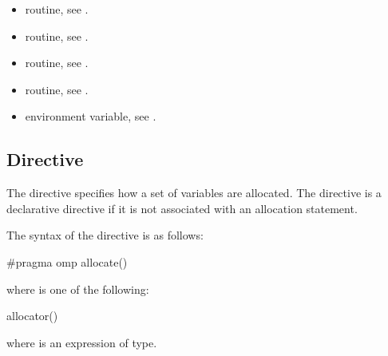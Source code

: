 \crossreferences
\begin{itemize}
\item {} routine, see .

\item {} routine, see .

\item {} routine, see .

\item {} routine, see .

\item {} environment variable, see .
\end{itemize}


\subsection{ Directive}
\label{subsec:allocate Directive}
\summary

The  directive specifies how a set of variables are allocated. The  directive is a declarative directive if it is not associated with an allocation statement.

\syntax
\begin{ccppspecific}
The syntax of the  directive is as follows:

\begin{ompcPragma}
#pragma omp allocate() 
\end{ompcPragma}

where  is one of the following:

\begin{indentedcodelist}
allocator()
\end{indentedcodelist}

where  is an expression of  type.

\end{ccppspecific}
\medskip

